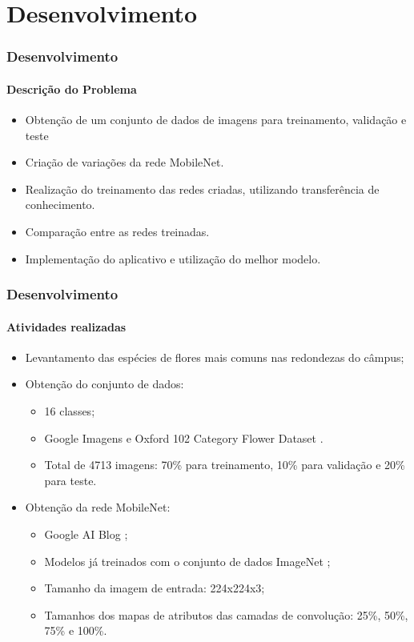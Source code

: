 \documentclass{beamer}
\begin{document}
    \section{Desenvolvimento}    
    \begin{frame}[t]
      \frametitle{Desenvolvimento}
      \framesubtitle{Descrição do Problema}
      \begin{itemize}    
			\item Obtenção de um conjunto de dados de imagens para treinamento, validação e teste            
            \item Criação de variações da rede MobileNet.
            \item Realização do treinamento das redes criadas, utilizando transferência de conhecimento.
            \item Comparação entre as redes treinadas.
            \item Implementação do aplicativo e utilização do melhor modelo.
            \end{itemize}
    \end{frame}
    
    
    \begin{frame}[t]
      \frametitle{Desenvolvimento}
      \framesubtitle{Atividades realizadas}      
      \begin{itemize}
        \item<1-> Levantamento das espécies de flores mais comuns nas redondezas do câmpus;\medskip
	    \item<2-> Obtenção do conjunto de dados:
	    		\begin{itemize}
	    			\item<3-> 16 classes;
	    			\item<4-> Google Imagens e Oxford 102 Category Flower Dataset \cite{oxford}.
	    			\item<5-> Total de 4713 imagens: 70\% para treinamento, 10\% para validação e 20\% para teste. \medskip
	    		\end{itemize}
        \item<6-> Obtenção da rede MobileNet: 
        		\begin{itemize}
	    			\item<7-> Google AI Blog \cite{googleaiblog};
	    			\item<7-> Modelos já treinados com o conjunto de dados ImageNet \cite{imagenet}; 
				\item<8-> Tamanho da imagem de entrada: 224x224x3;
				\item<8-> Tamanhos dos mapas de atributos das camadas de convolução: 25\%, 50\%, 75\% e 100\%.\medskip    		
	    		\end{itemize}     
      \end{itemize}
    \end{frame}
    
\end{document}
